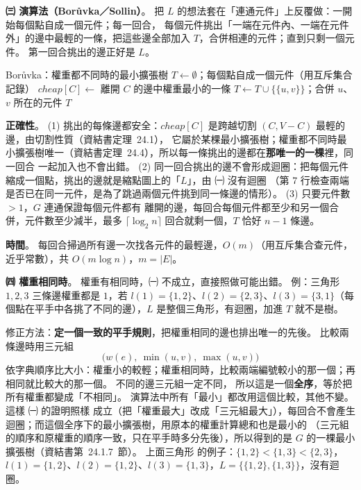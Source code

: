 \begin{pastsoln}
\textbf{㈢ 演算法（Borůvka／Sollin）}。 把 $L$ 的想法套在「連通元件」上反覆做：一開始每個點自成一個元件；每一回合，
每個元件挑出「一端在元件內、一端在元件外」的邊中最輕的一條，把這些邊全部加入 $T$，合併相連的元件；直到只剩一個元件。
第一回合挑出的邊正好是 $L$。
\begin{pseudo}[unbreakable]{Borůvka：權重都不同時的最小擴張樹}
    \State $T \gets \emptyset$；每個點自成一個元件（用互斥集合記錄）
            \State $\mathit{cheap}[C] \gets$ 離開 $C$ 的邊中權重最小的一條
        \EndFor
                \State $T \gets T \cup \{\{u, v\}\}$；合併 $u$、$v$ 所在的元件
            \EndIf
        \EndFor
    \EndWhile
    \State \Return $T$
\EndFunction
\end{pseudo}
\textbf{正確性}。 (1) 挑出的每條邊都安全：$\mathit{cheap}[C]$ 是跨越切割 $(C, V - C)$ 最輕的邊，由切割性質（資結書定理~24.1），
它屬於某棵最小擴張樹；權重都不同時最小擴張樹唯一（資結書定理~24.4），所以每一條挑出的邊都在\textbf{那唯一的一棵}裡，同一回合
一起加入也不會出錯。 (2) 同一回合挑出的邊不會形成迴圈：把每個元件縮成一個點，挑出的邊就是縮點圖上的「$L$」，由 ㈠ 沒有迴圈
（第 7 行檢查兩端是否已在同一元件，是為了跳過兩個元件挑到同一條邊的情形）。 (3) 只要元件數 $> 1$，$G$ 連通保證每個元件都有
離開的邊，每回合每個元件都至少和另一個合併，元件數至少減半，最多 $\lceil \log_2 n \rceil$ 回合就剩一個，$T$ 恰好 $n - 1$ 條邊。

\textbf{時間}。 每回合掃過所有邊一次找各元件的最輕邊，$O(m)$（用互斥集合查元件，近乎常數），共 $O(m \log n)$，$m = |E|$。

\textbf{㈣ 權重相同時}。 權重有相同時，㈠ 不成立，直接照做可能出錯。 例：三角形 $1, 2, 3$ 三條邊權重都是 $1$，若
$l(1) = \{1,2\}$、$l(2) = \{2,3\}$、$l(3) = \{3,1\}$（每個點在平手中各挑了不同的邊），$L$ 是整個三角形，有迴圈，加進 $T$ 就不是樹。

修正方法：\textbf{定一個一致的平手規則}，把權重相同的邊也排出唯一的先後。 比較兩條邊時用三元組
\[
\bigl(w(e),\ \min(u, v),\ \max(u, v)\bigr)
\]
依字典順序比大小：權重小的較輕；權重相同時，比較兩端編號較小的那一個；再相同就比較大的那一個。 不同的邊三元組一定不同，
所以這是一個\textbf{全序}，等於把所有權重都變成「不相同」。 演算法中所有「最小」都改用這個比較，其他不變。 這樣 ㈠ 的證明照樣
成立（把「權重最大」改成「三元組最大」），每回合不會產生迴圈；而這個全序下的最小擴張樹，用原本的權重計算總和也是最小的
（三元組的順序和原權重的順序一致，只在平手時多分先後），所以得到的是 $G$ 的一棵最小擴張樹（資結書第~24.1.7~節）。 上面三角形
的例子：$\{1,2\} < \{1,3\} < \{2,3\}$，$l(1) = \{1,2\}$、$l(2) = \{1,2\}$、$l(3) = \{1,3\}$，$L = \{\{1,2\}, \{1,3\}\}$，沒有迴圈。
\end{pastsoln}

